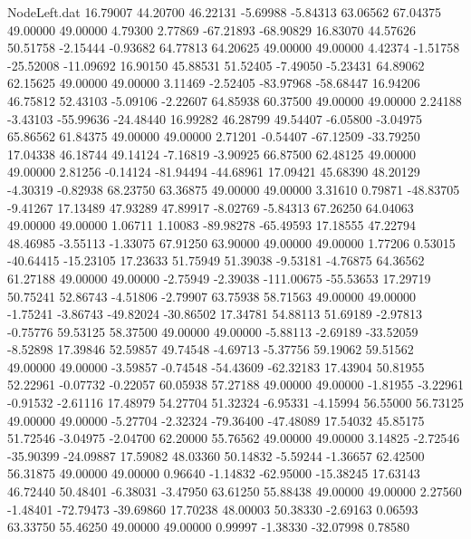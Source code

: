 \begin{filecontents}{NodeLeft.dat}
  16.79007   44.20700   46.22131    -5.69988   -5.84313   63.06562   67.04375   49.00000   49.00000    4.79300    2.77869  -67.21893  -68.90829
  16.83070   44.57626   50.51758    -2.15444   -0.93682   64.77813   64.20625   49.00000   49.00000    4.42374   -1.51758  -25.52008  -11.09692
  16.90150   45.88531   51.52405    -7.49050   -5.23431   64.89062   62.15625   49.00000   49.00000    3.11469   -2.52405  -83.97968  -58.68447
  16.94206   46.75812   52.43103    -5.09106   -2.22607   64.85938   60.37500   49.00000   49.00000    2.24188   -3.43103  -55.99636  -24.48440
  16.99282   46.28799   49.54407    -6.05800   -3.04975   65.86562   61.84375   49.00000   49.00000    2.71201   -0.54407  -67.12509  -33.79250
  17.04338   46.18744   49.14124    -7.16819   -3.90925   66.87500   62.48125   49.00000   49.00000    2.81256   -0.14124  -81.94494  -44.68961
  17.09421   45.68390   48.20129    -4.30319   -0.82938   68.23750   63.36875   49.00000   49.00000    3.31610    0.79871  -48.83705   -9.41267
  17.13489   47.93289   47.89917    -8.02769   -5.84313   67.26250   64.04063   49.00000   49.00000    1.06711    1.10083  -89.98278  -65.49593
  17.18555   47.22794   48.46985    -3.55113   -1.33075   67.91250   63.90000   49.00000   49.00000    1.77206    0.53015  -40.64415  -15.23105
  17.23633   51.75949   51.39038    -9.53181   -4.76875   64.36562   61.27188   49.00000   49.00000   -2.75949   -2.39038 -111.00675  -55.53653
  17.29719   50.75241   52.86743    -4.51806   -2.79907   63.75938   58.71563   49.00000   49.00000   -1.75241   -3.86743  -49.82024  -30.86502
  17.34781   54.88113   51.69189    -2.97813   -0.75776   59.53125   58.37500   49.00000   49.00000   -5.88113   -2.69189  -33.52059   -8.52898
  17.39846   52.59857   49.74548    -4.69713   -5.37756   59.19062   59.51562   49.00000   49.00000   -3.59857   -0.74548  -54.43609  -62.32183
  17.43904   50.81955   52.22961    -0.07732   -0.22057   60.05938   57.27188   49.00000   49.00000   -1.81955   -3.22961   -0.91532   -2.61116
  17.48979   54.27704   51.32324    -6.95331   -4.15994   56.55000   56.73125   49.00000   49.00000   -5.27704   -2.32324  -79.36400  -47.48089
  17.54032   45.85175   51.72546    -3.04975   -2.04700   62.20000   55.76562   49.00000   49.00000    3.14825   -2.72546  -35.90399  -24.09887
  17.59082   48.03360   50.14832    -5.59244   -1.36657   62.42500   56.31875   49.00000   49.00000    0.96640   -1.14832  -62.95000  -15.38245
  17.63143   46.72440   50.48401    -6.38031   -3.47950   63.61250   55.88438   49.00000   49.00000    2.27560   -1.48401  -72.79473  -39.69860
  17.70238   48.00003   50.38330    -2.69163    0.06593   63.33750   55.46250   49.00000   49.00000    0.99997   -1.38330  -32.07998    0.78580

\end{filecontents}
